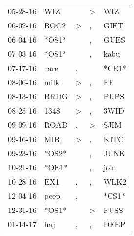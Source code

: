 \begin{supertabular}{p{0.07\textwidth}p{0.06\textwidth}p{0.02\textwidth}p{0.02\textwidth}p{0.06\textwidth}}
          05-28-16\textsuperscript{} &   WIZ\textsuperscript{} &               &     \textgreater &   WIZ\textsuperscript{} \\
          06-02-16\textsuperscript{} &  ROC2\textsuperscript{} &  \textgreater &                , &  GIFT\textsuperscript{} \\
          06-04-16\textsuperscript{} &                   *OS1* &               &                , &  GUES\textsuperscript{} \\
          07-03-16\textsuperscript{} &                   *OS1* &               &                , &  kabu\textsuperscript{} \\
          07-17-16\textsuperscript{} &  care\textsuperscript{} &             , &                  &                   *CE1* \\
          08-06-16\textsuperscript{} &  milk\textsuperscript{} &  \textgreater &                , &    FF\textsuperscript{} \\
          08-13-16\textsuperscript{} &  BRDG\textsuperscript{} &  \textgreater &                , &  PUPS\textsuperscript{} \\
          08-25-16\textsuperscript{} &  1348\textsuperscript{} &  \textgreater &                , &  3WID\textsuperscript{} \\
          09-09-16\textsuperscript{} &  ROAD\textsuperscript{} &             , &     \textgreater &  SJIM\textsuperscript{} \\
          09-16-16\textsuperscript{} &   MIR\textsuperscript{} &  \textgreater &                , &  KITC\textsuperscript{} \\
          09-23-16\textsuperscript{} &                   *OS2* &               &                , &  JUNK\textsuperscript{} \\
          10-21-16\textsuperscript{} &                   *OE1* &               &                , &  join\textsuperscript{} \\
          10-28-16\textsuperscript{} &   EX1\textsuperscript{} &             , &                , &  WLK2\textsuperscript{} \\
          12-04-16\textsuperscript{} &  peep\textsuperscript{} &             , &                  &                   *CS1* \\
          12-31-16\textsuperscript{} &                   *OS1* &               &     \textgreater &  FUSS\textsuperscript{} \\
          01-14-17\textsuperscript{} &   haj\textsuperscript{} &             , &                , &  DEEP\textsuperscript{} \\

\end{supertabular}
